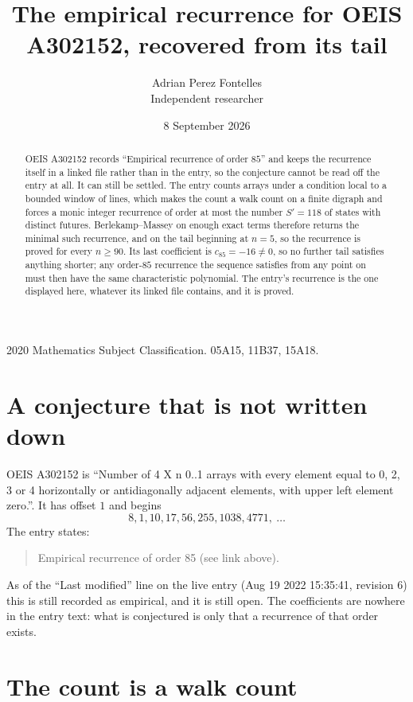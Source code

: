 \documentclass[11pt,a4paper]{article}
\title{The empirical recurrence for OEIS A302152, recovered from its tail}
\author{Adrian Perez Fontelles\\ \small Independent researcher}
\date{8 September 2026}
\theoremstyle{plain}
\theoremstyle{definition}
\begin{document}
\maketitle

\begin{abstract}
OEIS A302152 records ``Empirical recurrence of order $85$'' and keeps the recurrence itself in
a linked file rather than in the entry, so the conjecture cannot be read off the entry at all.
It can still be settled. The entry counts arrays under a condition local to a bounded window of
lines, which makes the count a walk count on a finite digraph and forces a monic integer
recurrence of order at most the number $S'=118$ of states with distinct futures. Berlekamp--Massey on
enough exact terms therefore returns the minimal such recurrence, and on the tail beginning at $n=5$, so the recurrence is proved for every $n\ge90$.
Its last coefficient is $c_{85}=-16\neq0$, so no further tail satisfies anything
shorter; any order-$85$ recurrence the sequence satisfies from any point on must then have
the same characteristic polynomial. The entry's recurrence is the one displayed here, whatever
its linked file contains, and it is proved.
\end{abstract}

\noindent\small 2020 Mathematics Subject Classification. 05A15, 11B37, 15A18.\normalsize

\section{A conjecture that is not written down}

OEIS A302152 is ``Number of 4 X n 0..1 arrays with every element equal to 0, 2, 3 or 4 horizontally or antidiagonally adjacent elements, with upper left element zero.''. It has offset $1$ and begins
\[
8, 1, 10, 17, 56, 255, 1038, 4771,\ \dots
\]
The entry states:
\begin{quote}
Empirical recurrence of order 85 (see link above).
\end{quote}
As of the ``Last modified'' line on the live entry (Aug 19 2022 15:35:41, revision 6)
this is still recorded as empirical, and it is still open. The coefficients are nowhere in the
entry text: what is conjectured is only that a recurrence of that order exists.

\section{The count is a walk count}
\end{document}
